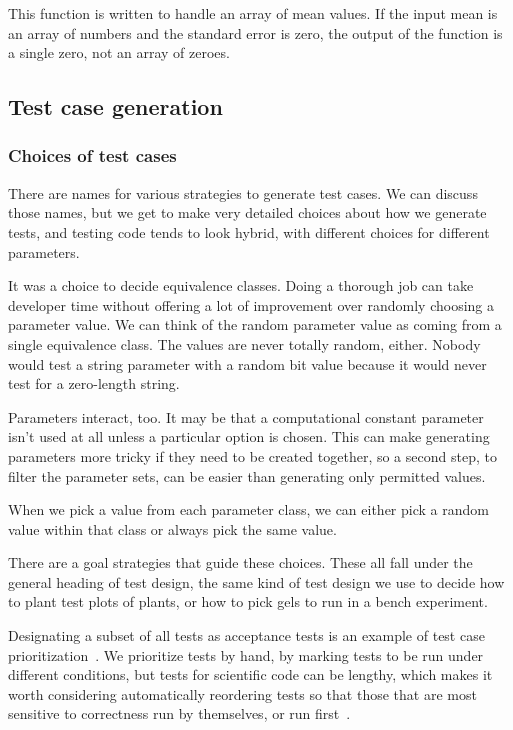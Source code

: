 \documentclass[fleqn,10pt]{olplainarticle}
\begin{document}
This function is written to handle an array of mean values.
If the input mean is an array of numbers and the standard error
is zero, the output of the function is a single zero, not an array
of zeroes.


\subsection{Test case generation}


\subsubsection{Choices of test cases}
There are names for various strategies to generate test cases.
We can discuss those names, but we get to make very detailed
choices about how we generate tests, and testing code tends
to look hybrid, with different choices for different parameters.

It was a choice to decide equivalence classes. Doing a thorough
job can take developer time without offering a lot of improvement
over randomly choosing a parameter value. We can think of the
random parameter value as coming from a single equivalence
class. The values are never
totally random, either. Nobody would test a string parameter with
a random bit value because it would never test for a zero-length
string.

Parameters interact, too. It may be that a computational constant
parameter isn't used at all unless a particular option is chosen.
This can make generating parameters more tricky if they need
to be created together, so a second step, to filter the parameter
sets, can be easier than generating only permitted values.

When we pick a value from each parameter class, we can either
pick a random value within that class or always pick the
same value.

There are a goal strategies that guide these choices.
These all fall under the general heading of test design,
the same kind of test design we use to decide how
to plant test plots of plants, or how to pick gels to
run in a bench experiment.

Designating a subset of all tests as acceptance tests is an
example of test case prioritization~\cite{rothermel1999test}.
We prioritize tests by hand, by marking tests to be run under
different conditions, but tests for scientific code can be lengthy,
which makes it worth considering automatically reordering tests
so that those that are most sensitive to correctness run by 
themselves, or run first~\cite{yoo2012regression}.
\end{document}

